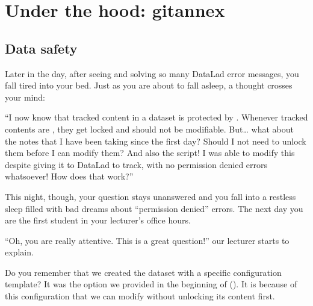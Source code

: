 \chapter{Under the hood: git\sphinxhyphen{}annex}
\label{\detokenize{basics/basics-annex:under-the-hood-git-annex}}\label{\detokenize{basics/basics-annex:chapter-gitannex}}\label{\detokenize{basics/basics-annex::doc}}

\sphinxstepscope


\section{Data safety}
\label{\detokenize{basics/101-114-txt2git:data-safety}}\label{\detokenize{basics/101-114-txt2git:text2git}}\label{\detokenize{basics/101-114-txt2git::doc}}
\sphinxAtStartPar
Later in the day, after seeing and solving so many DataLad error messages,
you fall tired into your
bed. Just as you are about to fall asleep, a thought crosses your mind:

\sphinxAtStartPar
“I now know that tracked content in a dataset is protected by {\hyperref[\detokenize{glossary:term-git-annex}]{}}.
Whenever tracked contents are , they get locked and should not be
modifiable. But… what about the notes that I have been taking since the first day?
Should I not need to unlock them before I can modify them? And also the script!
I was able to modify this despite giving it to DataLad to track, with
no permission denied errors whatsoever! How does that work?”

\sphinxAtStartPar
This night, though, your question stays unanswered and you fall into a restless
sleep filled with bad dreams about “permission denied” errors. The next day you are
the first student in your lecturer’s office hours.

\sphinxAtStartPar
“Oh, you are really attentive. This is a great question!” our lecturer starts
to explain.

\ignorespaces 
\sphinxAtStartPar
Do you remember that we created the  dataset with a
specific configuration template? It was the  option we
provided in the beginning of {\hyperref[\detokenize{basics/101-101-create:createds}]{}} (). It is because of this configuration
that we can modify  without unlocking its content first.

